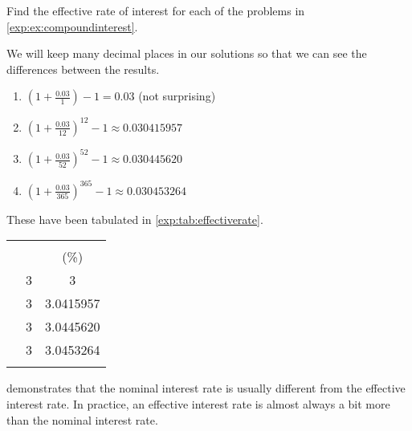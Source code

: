 \begin{pccexample}\label{exp:ex:effectiverate}
	Find the effective rate of interest for each of the problems in \cref{exp:ex:compoundinterest}.
										
	\begin{pccsolution}
		We will keep many decimal places in our solutions so that we can see the differences between 
		the results.
		\begin{enumerate}
			\item $\left( 1+\frac{0.03}{1} \right)-1=0.03$ (not surprising)
			\item $\left( 1+\frac{0.03}{12} \right)^{12}-1\approx 0.030415957$
			\item $\left( 1+\frac{0.03}{52} \right)^{52}-1\approx 0.030445620$
			\item $\left(1+\frac{0.03}{365}\right)^{365}-1\approx 0.030453264$
		\end{enumerate}
		These have been tabulated in \cref{exp:tab:effectiverate}.
	\end{pccsolution}
\end{pccexample}
\begin{margintable}
	\centering
	\begin{tabular}{S[table-format=3.0]S[table-format=1.0]S[table-format=1.7]}
		\beforeheading
		 &    &  \\
		              &  &  (\%) \\
		             & 3                   & 3                   \\             & 3                   & 3.0415957           \\             & 3                   & 3.0445620           \\            & 3                   & 3.0453264           \\ \lastline
	\end{tabular}
	\label{exp:tab:effectiverate}
\end{margintable}
			
 demonstrates that the nominal interest rate is usually different from the effective interest rate.  
In practice, an effective interest rate is almost always a bit more than the nominal interest rate.  
			
